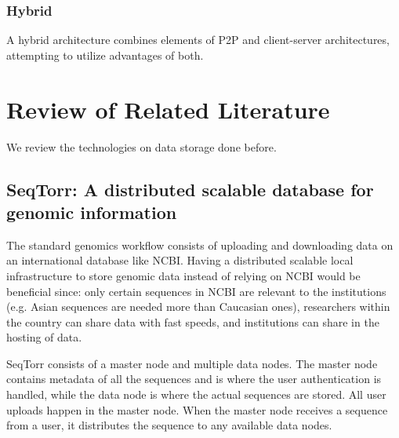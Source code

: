 \documentclass{article}
\begin{document}
\subsubsection{Hybrid}
A hybrid architecture combines elements of P2P and client-server architectures, attempting to utilize advantages of both.






\section{Review of Related Literature}

We review the technologies on data storage done before. 

\subsection{SeqTorr: A distributed scalable database for genomic information}
The standard genomics workflow consists of uploading and downloading data on an international database like NCBI. Having a distributed scalable local infrastructure to store genomic data instead of relying on NCBI would be beneficial since: only certain sequences in NCBI are relevant to the institutions (e.g. Asian sequences are needed more than Caucasian ones), researchers within the country can share data with fast speeds, and  institutions can share in the hosting of data.

SeqTorr consists of a master node and multiple data nodes. The master node contains metadata of all the sequences and is where the user authentication is handled, while the data node is where the actual sequences are stored. All user uploads happen in the master node. When the master node receives a sequence from a user, it distributes the sequence to any available data nodes. 
\autocite{seqtorr}
\end{document}
